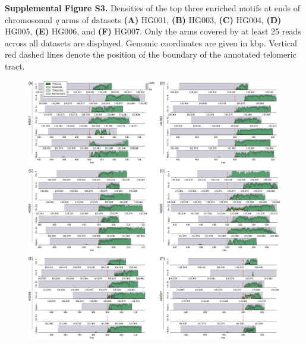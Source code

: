 \documentclass{article}
\begin{document}

\begin{samepage}
\noindent \textbf{Supplemental Figure S3.}
Densities of the top three enriched motifs at ends of chromosomal \textit{q} arms of datasets
\textbf{(A)} HG001,
\textbf{(B)} HG003,
\textbf{(C)} HG004,
\textbf{(D)} HG005,
\textbf{(E)} HG006, and
\textbf{(F)} HG007.
Only the arms covered by at least 25 reads across all datasets are displayed.
Genomic coordinates are given in kbp.
Vertical red dashed lines denote the position of the boundary of the annotated telomeric tract.

\begin{figure}[ht!] \centering
\includegraphics[width=\textwidth,keepaspectratio]{Figure_S3-nolegend.pdf}
\end{figure}
\end{samepage}
\end{document}

